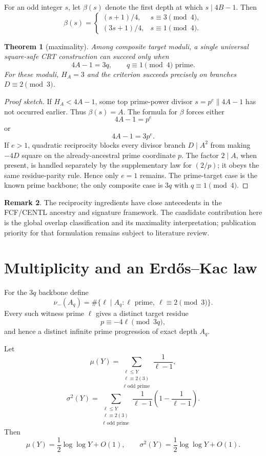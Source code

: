 \documentclass[11pt]{article}
\newtheorem{theorem}{Theorem}
\theoremstyle{definition}
\newtheorem{remark}[theorem]{Remark}
\begin{document}
For an odd integer $s$, let $\beta(s)$ denote the first depth at which $s\mid4B-1$. Then
\[
\beta(s)=
\begin{cases}
(s+1)/4,&s\equiv3\pmod4,\\
(3s+1)/4,&s\equiv1\pmod4.
\end{cases}
\]

\begin{theorem}[maximality]\label{thm:maximality}
Among composite target moduli, a single universal square-safe CRT construction can succeed only when
\[
\boxed{4A-1=3q,\qquad q\equiv1\pmod4\text{ prime}.}
\]
For these moduli, $H_A=3$ and the criterion succeeds precisely on branches $D\equiv2\pmod3$.
\end{theorem}

\begin{proof}[Proof sketch]
If $H_A<4A-1$, some top prime-power divisor $s=p^e\parallel4A-1$ has not occurred earlier. Thus $\beta(s)=A$. The formula for $\beta$ forces either
\[
4A-1=p^e
\]
or
\[
4A-1=3p^e.
\]
If $e>1$, quadratic reciprocity blocks every divisor branch $D\mid A^2$ from making $-4D$ square on the already-ancestral prime coordinate $p$. The factor $2\mid A$, when present, is handled separately by the supplementary law for $(2/p)$; it obeys the same residue-parity rule. Hence only $e=1$ remains. The prime-target case is the known prime backbone; the only composite case is $3q$ with $q\equiv1\pmod4$.
\end{proof}

\begin{remark}
The reciprocity ingredients have close antecedents in the FCF/CENTL ancestry and signature framework. The candidate contribution here is the global overlap classification and its maximality interpretation; publication priority for that formulation remains subject to literature review.
\end{remark}

\section{Multiplicity and an Erd\H{o}s--Kac law}
For the $3q$ backbone define
\[
\nu_-(A_q)=\#\{\ell\mid A_q:\ell\text{ prime},\ \ell\equiv2\pmod3\}.
\]
Every such witness prime $\ell$ gives a distinct target residue
\[
p\equiv-4\ell\pmod{3q},
\]
and hence a distinct infinite prime progression of exact depth $A_q$.

Let
\[
\mu(Y)=\sum_{\substack{\ell\le Y\\\ell\equiv2(3)\\\ell\text{ odd prime}}}
\frac1{\ell-1},
\]
\[
\sigma^2(Y)=\sum_{\substack{\ell\le Y\\\ell\equiv2(3)\\\ell\text{ odd prime}}}
\frac1{\ell-1}\left(1-\frac1{\ell-1}\right).
\]
Then
\[
\mu(Y)=\frac12\log\log Y+O(1),\qquad
\sigma^2(Y)=\frac12\log\log Y+O(1).
\]
\end{document}
